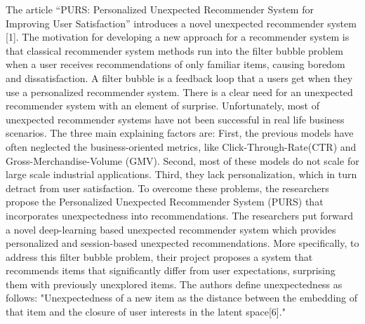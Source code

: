 The article “PURS: Personalized Unexpected Recommender System for Improving User Satisfaction” introduces a novel unexpected recommender system [1]. The motivation for developing a new approach for a recommender system is that classical recommender system methods run into the filter bubble problem when a user receives recommendations of only familiar items, causing boredom and dissatisfaction. A filter bubble is a feedback loop that a users get when they use a personalized recommender system. There is a clear need for an unexpected recommender system with an element of surprise.
Unfortunately, most of unexpected recommender systems have not been successful in real life business scenarios. The three main explaining factors are: First, the previous models have often neglected the business-oriented metrics, like  Click-Through-Rate(CTR) and Gross-Merchandise-Volume (GMV). Second, most of these models do not scale for large scale industrial applications. Third, they lack personalization, which in turn detract from user satisfaction. To overcome these problems, the researchers propose the Personalized Unexpected Recommender System (PURS) that incorporates unexpectedness into recommendations. The researchers put forward a novel deep-learning based unexpected recommender system which provides personalized and session-based unexpected recommendations. More specifically, to address this filter bubble problem, their project proposes a system that recommends items that significantly differ from user expectations, surprising them with previously unexplored items. The authors define unexpectedness as follows: "Unexpectedness of a new item as the distance between the embedding of that item and the closure of user interests in the latent space[6]." 
	
